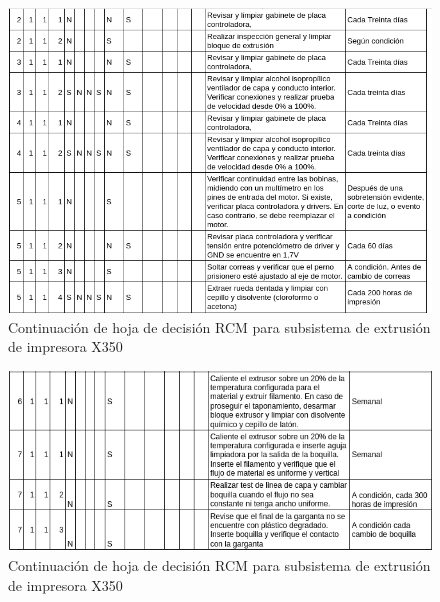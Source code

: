 \begin{figure}[H]
\centering
\includegraphics[scale=0.7]{images/decision2.png}
\caption{Continuación de hoja de decisión RCM para subsistema de extrusión de impresora X350}
\end{figure}
\begin{figure}[H]
\centering
\includegraphics[scale=0.7]{images/decision3.png}
\caption{Continuación de hoja de decisión RCM para subsistema de extrusión de impresora X350}
\end{figure}

